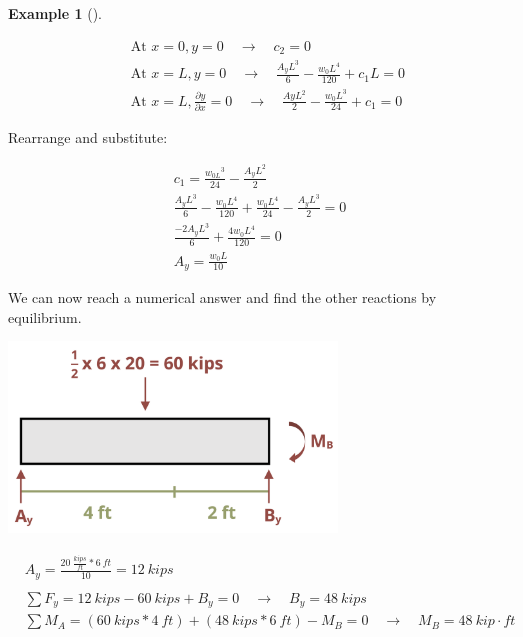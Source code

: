 \documentclass[
  letterpaper,
  DIV=11,
  numbers=noendperiod]{scrreprt}
\theoremstyle{definition}
\newtheorem{example}{Example}[chapter]
\theoremstyle{remark}
\begin{document}
\begin{tcolorbox}
\begin{example}[]
\begin{tcolorbox}
\[
\begin{aligned} & \text { At } x=0, y=0 \quad \rightarrow \quad c_2=0 \\ & \text { At } x=L, y=0 \quad \rightarrow \quad \frac{A_y L^3}{6}-\frac{w_0 L^4}{120}+c_1 L=0 \\ & \text { At } x=L, \frac{\partial y}{\partial x}=0 \quad \rightarrow \quad \frac{A y L^2}{2}-\frac{w_0 L^3}{24}+c_1=0\end{aligned}
\]

Rearrange and substitute:

\[
\begin{gathered}c_1=\frac{w_{0 L}{ }^3}{24}-\frac{A_y L^2}{2} \\ \frac{A_y L^3}{6}-\frac{w_0 L^4}{120}+\frac{w_0 L^4}{24}-\frac{A_y L^3}{2}=0 \\ \frac{-2 A_y L^3}{6}+\frac{4 w_{0} L^4}{120}=0 \\ A_y=\frac{w_0 L}{10}\end{gathered}
\]

We can now reach a numerical answer and find the other reactions by
equilibrium.

\begin{center}
\includegraphics[width=3.4375in,height=\textheight]{images/CH11 PNGs/example11.6-4.png}
\end{center}

\[
\begin{aligned}
&A_y=\frac{20~\frac{kips}{ft}*6{~ft}}{10}=12{~kips} \\
\\
& \sum F_y=12{~kips}-60{~kips}+B_y=0 \quad \rightarrow \quad B_y=48{~kips} \\
& \sum M_A=(60{~kips}* 4{~ft})+(48{~kips}*6{~ft})-M_B=0 \quad \rightarrow \quad M_B=48{~kip}\cdot{ft} \\ & \end{aligned}
\]

\end{tcolorbox}

\end{example}

\end{tcolorbox}
\end{document}
